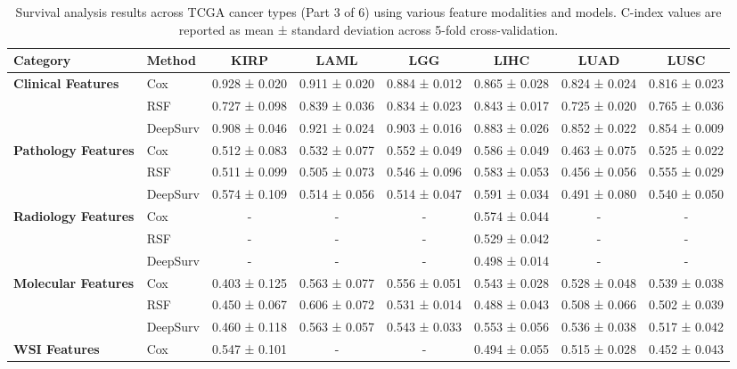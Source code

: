 \begin{sidewaystable}[htbp]
    \centering
    \caption{Survival analysis results across TCGA cancer types (Part 3 of 6) using various feature modalities and models. C-index values are reported as mean ± standard deviation across 5-fold cross-validation.}
    \label{tab:survival_results_3}
    \begin{tabular}{@{}llcccccc@{}}
        \toprule
        \textbf{Category} & \textbf{Method} & \textbf{KIRP} & \textbf{LAML} & \textbf{LGG} & \textbf{LIHC} & \textbf{LUAD} & \textbf{LUSC} \\
        \midrule
        \multirow{3}{*}{\textbf{Clinical Features}} & Cox & 0.928 ± 0.020 & 0.911 ± 0.020 & 0.884 ± 0.012 & 0.865 ± 0.028 & 0.824 ± 0.024 & 0.816 ± 0.023 \\
        & RSF & 0.727 ± 0.098 & 0.839 ± 0.036 & 0.834 ± 0.023 & 0.843 ± 0.017 & 0.725 ± 0.020 & 0.765 ± 0.036 \\
        & DeepSurv & 0.908 ± 0.046 & 0.921 ± 0.024 & 0.903 ± 0.016 & 0.883 ± 0.026 & 0.852 ± 0.022 & 0.854 ± 0.009 \\
        \midrule
        \multirow{3}{*}{\textbf{Pathology Features}} & Cox & 0.512 ± 0.083 & 0.532 ± 0.077 & 0.552 ± 0.049 & 0.586 ± 0.049 & 0.463 ± 0.075 & 0.525 ± 0.022 \\
        & RSF & 0.511 ± 0.099 & 0.505 ± 0.073 & 0.546 ± 0.096 & 0.583 ± 0.053 & 0.456 ± 0.056 & 0.555 ± 0.029 \\
        & DeepSurv & 0.574 ± 0.109 & 0.514 ± 0.056 & 0.514 ± 0.047 & 0.591 ± 0.034 & 0.491 ± 0.080 & 0.540 ± 0.050 \\
        \midrule
        \multirow{3}{*}{\textbf{Radiology Features}} & Cox & - & - & - & 0.574 ± 0.044 & - & - \\
        & RSF & - & - & - & 0.529 ± 0.042 & - & - \\
        & DeepSurv & - & - & - & 0.498 ± 0.014 & - & - \\
        \midrule
        \multirow{3}{*}{\textbf{Molecular Features}} & Cox & 0.403 ± 0.125 & 0.563 ± 0.077 & 0.556 ± 0.051 & 0.543 ± 0.028 & 0.528 ± 0.048 & 0.539 ± 0.038 \\
        & RSF & 0.450 ± 0.067 & 0.606 ± 0.072 & 0.531 ± 0.014 & 0.488 ± 0.043 & 0.508 ± 0.066 & 0.502 ± 0.039 \\
        & DeepSurv & 0.460 ± 0.118 & 0.563 ± 0.057 & 0.543 ± 0.033 & 0.553 ± 0.056 & 0.536 ± 0.038 & 0.517 ± 0.042 \\
        \midrule
        \multirow{3}{*}{\textbf{WSI Features}} & Cox & 0.547 ± 0.101 & - & - & 0.494 ± 0.055 & 0.515 ± 0.028 & 0.452 ± 0.043 \\

\end{tabular}
\end{sidewaystable}
